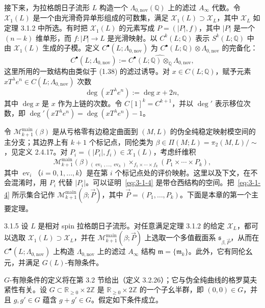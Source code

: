 接下来，为拉格朗日子流形 $L$ 构造一个
$\Lambda_{0,\mathrm{nov}}(\mathbb Q)$ 上的滤过 $A_\infty$ 代数。令
$\mathcal X_1(L)$ 是一个由光滑奇异单形组成的可数集，满足
$\mathcal X_1(L)\supset\mathcal X_L$，其中 $\mathcal X_L$ 如定理 3.1.2 中所选。有时把
$\mathcal X_1(L)$ 的元素写成 $P=(|P|,f)$，其中 $|P|$ 是一个
$(n-k)$ 维单形，而 $f\colon|P|\to L$ 是光滑映射。以
$C^k(L;\mathbb Q)$ 表示 $S^k(L;\mathbb Q)$ 中由 $\mathcal X_1(L)$ 生成的子模。定义
$C^\bullet(L;\Lambda_{0,\mathrm{nov}})$ 为
$C^\bullet(L;\mathbb Q)\otimes\Lambda_{0,\mathrm{nov}}$ 的完备化：
\[
  C^\bullet(L;\Lambda_{0,\mathrm{nov}})
  :=\widehat{C^\bullet(L;\mathbb Q)
  \otimes_{\mathbb Q}\Lambda_{0,\mathrm{nov}}},
\]
这里所用的一致结构由类似于 (1.38) 的滤过诱导。对
$x\in C(L;\mathbb Q)$，赋予元素 $xT^\lambda e^n\in
C(L;\Lambda_{0,\mathrm{nov}})$ 次数
\[
  \deg(xT^\lambda e^n):=\deg x+2n,
\]
其中 $\deg x$ 是 $x$ 作为上链的次数。令 $C[1]^k=C^{k+1}$，并以
$\deg'$ 表示移位次数，即
$\deg'(xT^\lambda e^n)=\deg(xT^\lambda e^n)-1$。

令 $\mathcal M_{k+1}^{\mathrm{main}}(\beta)$ 是从亏格零有边稳定曲面到
$(M,L)$ 的伪全纯稳定映射模空间的主分支；其边界上有 $k+1$ 个标记点，同伦类为
$\beta\in\Pi(M;L)=\pi_2(M,L)/\sim$，见定义 2.4.17。对
$P_i=(|P_i|,f_i)\in\mathcal X_1(L)$，考虑纤维积
\begin{equation}
  \mathcal M_{k+1}^{\mathrm{main}}(\beta)
  {}_{(\operatorname{ev}_1,\ldots,\operatorname{ev}_k)}
  \!\times_{f_1\times\cdots\times f_k}
  (P_1\times\cdots\times P_k),
  \tag{3.1.4}\label{eq:3-1-4}
\end{equation}
其中 $\operatorname{ev}_i$（$i=0,1,\ldots,k$）是在第 $i$ 个标记点处的评价映射。这里以及下文，在不会混淆时，用 $P_i$ 代替 $|P_i|$。可以证明~\eqref{eq:3-1-4} 是带仓西结构的空间。把~\eqref{eq:3-1-4} 所示集合记作
$\mathcal M_{k+1}^{\mathrm{main}}(\beta;\vec P)$，其中
$\vec P=(P_1,\ldots,P_k)$。下面是本章的第一个主要定理。

\begin{theorem}{3.1.5}\label{thm:3-1-5}
设 $L$ 是相对 spin 拉格朗日子流形。对任意满足定理 3.1.2 的给定
$\mathcal X_L$，都可以选取 $\mathcal X_1(L)\supset\mathcal X_L$，并在
$\mathcal M_{k+1}^{\mathrm{main}}(\beta;\vec P)$ 上选取一个多值截面系
$\mathfrak s_{\beta,\vec P}$，从而在
$C^\bullet(L;\Lambda_{0,\mathrm{nov}})$ 上构造
$\Lambda_{0,\mathrm{nov}}$ 上的滤过 $A_\infty$ 结构
$\mathfrak m=\{\mathfrak m_k\}$。此外，它有同伦幺元，并满足
$G(L)$-有隙条件。
\end{theorem}

$G$-有隙条件的定义将在第 3.2 节给出（定义 3.2.26）；它与伪全纯曲线的格罗莫夫紧性有关。设
$G\subset\mathbb R_{\geq0}\times2\mathbb Z$ 是
$\mathbb R_{\geq0}\times2\mathbb Z$ 的一个子幺半群，即
$(0,0)\in G$，并且 $g,g'\in G$ 蕴含 $g+g'\in G$。假定如下条件成立。


